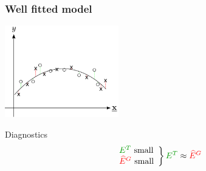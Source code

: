 \begin{frame}\frametitle{Well fitted model} 
	\begin{center}
		\includegraphics[height=4cm]{img/section1_fig29}
	\end{center}

	\begin{block}{Diagnostics}
		$$
			\left. \begin{array}{l}
				{\color{darkgreen}E^T} \text{ small} \\
				 {\color{red}\widehat E^G} \text{ small}
			\end{array} \right \} {\color{darkgreen}E^T} \approx {\color{red}\widehat E^G}
		$$
	\end{block}
\end{frame}



